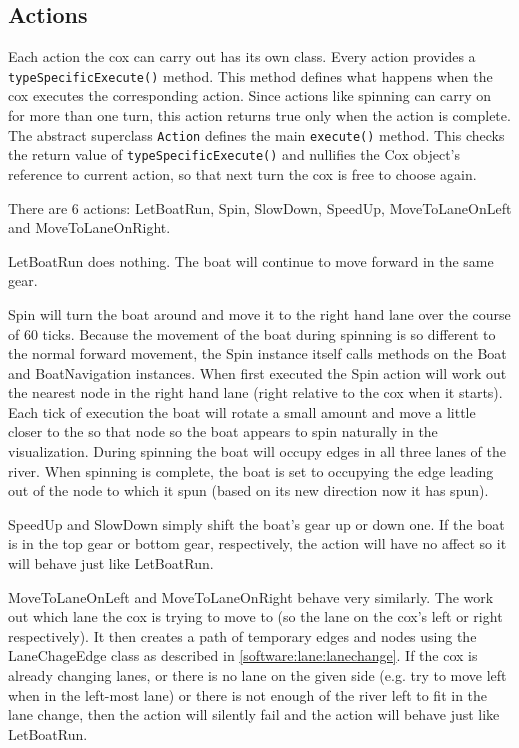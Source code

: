 \subsection{Actions}
  Each action the cox can carry out has its own class. Every action provides a \texttt{typeSpecificExecute()} method. This method defines what happens when the cox executes the corresponding action. Since actions like spinning can carry on for more than one turn, this action returns true only when the action is complete. The abstract superclass \texttt{Action} defines the main \texttt{execute()} method. This checks the return value of \texttt{typeSpecificExecute()} and nullifies the Cox object's reference to current action, so that next turn the cox is free to choose again.

  There are 6 actions: LetBoatRun, Spin, SlowDown, SpeedUp, MoveToLaneOnLeft and MoveToLaneOnRight.
  
  LetBoatRun does nothing. The boat will continue to move forward in the same gear.
  
  Spin will turn the boat around and move it to the right hand lane over the course of 60 ticks. Because the movement of the boat during spinning is so different to the normal forward movement, the Spin instance itself calls methods on the Boat and BoatNavigation instances. When first executed the Spin action will work out the nearest node in the right hand lane (right relative to the cox when it starts). Each tick of execution the boat will rotate a small amount and move a little closer to the so that node so the boat appears to spin naturally in the visualization. During spinning the boat will occupy edges in all three lanes of the river. When spinning is complete, the boat is set to occupying the edge leading out of the node to which it spun (based on its new direction now it has spun).
  
  SpeedUp and SlowDown simply shift the boat's gear up or down one. If the boat is in the top gear or bottom gear, respectively, the action will have no affect so it will behave just like LetBoatRun.
  
  MoveToLaneOnLeft and MoveToLaneOnRight behave very similarly. The work out which lane the cox is trying to move to (so the lane on the cox's left or right respectively). It then creates a path of temporary edges and nodes using the LaneChageEdge class as described in \ref{software:lane:lanechange}. If the cox is already changing lanes, or there is no lane on the given side (e.g. try to move left when in the left-most lane) or there is not enough of the river left to fit in the lane change, then the action will silently fail and the action will behave just like LetBoatRun.

